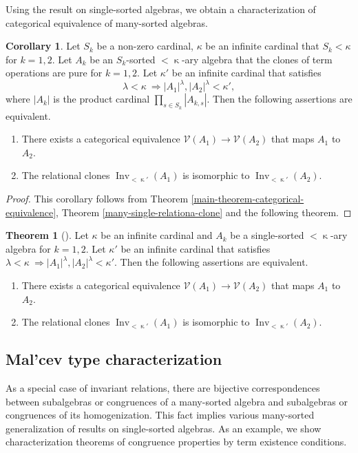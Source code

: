 \documentclass[a4paper,10pt]{article}
\theoremstyle{definition}
\newtheorem{thm}[df]{Theorem}
\newtheorem{cor}[df]{Corollary}
\newcommand\ra{\rightarrow}
\newcommand\mc{\mathclose}
\newcommand\V{\mathcal{V}}
\DeclareMathOperator{\Inv}{Inv}
\begin{document}
Using the result on single-sorted algebras, we obtain a characterization
of categorical equivalence of many-sorted algebras.
\begin{cor}
Let $S_k$ be a non-zero cardinal, $\kappa$ be an infinite cardinal that $S_k<\kappa$ for $k=1,2$.
Let $A_k$ be an $S_k$-sorted $<\mc\kappa$-ary algebra that the clones of term operations are pure for $k=1,2$.
Let $\kappa'$ be an infinite cardinal that satisfies
\[
\lambda<\kappa\ \Longrightarrow |A_1|^\lambda, |A_2|^\lambda <\kappa',
\]
where $|A_k|$ is the product cardinal $\prod_{s\in S_k} |A_{k,s}|$.
Then the following assertions are equivalent.
\begin{enumerate}
\item
There exists a categorical equivalence $\V(A_1)\ra\V(A_2)$ that maps $A_1$ to $A_2$.
\item
The relational clones $\Inv_{<\mc\kappa'}(A_1)$ is isomorphic to $\Inv_{<\mc\kappa'}(A_2)$.
\end{enumerate}
\end{cor}
\begin{proof}
This corollary follows from 
Theorem \ref{main-theorem-categorical-equivalence},
Theorem \ref{many-single-relationa-clone} and 
the following theorem.
\end{proof}

\begin{thm}[\cite{Izainf}]
Let $\kappa$ be an infinite cardinal and
$A_k$ be a single-sorted $<\mc\kappa$-ary algebra for $k=1,2$.
Let $\kappa'$ be an infinite cardinal that satisfies
$\lambda<\kappa\ \Longrightarrow |A_1|^\lambda,|A_2|^\lambda<\kappa'$.
Then the following assertions are equivalent.
\begin{enumerate}
\item
There exists a categorical equivalence $\V(A_1)\ra\V(A_2)$ that maps $A_1$ to $A_2$.
\item
The relational clones $\Inv_{<\mc\kappa'}(A_1)$ is isomorphic to $\Inv_{<\mc\kappa'}(A_2)$.
\end{enumerate}
\end{thm}

\subsection{Mal'cev type characterization} \label{s-malcev-type-characterization}

As a special case of invariant relations, there are bijective correspondences
between subalgebras or congruences of a many-sorted algebra and subalgebras or congruences
of its homogenization.
This fact implies various many-sorted generalization of results on single-sorted algebras.
As an example, we show characterization theorems of congruence properties by
term existence conditions.
\end{document}
